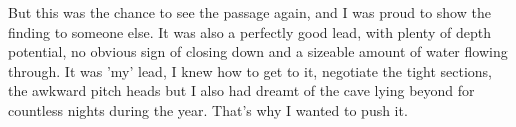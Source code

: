 But this was the chance to see the passage again, and I was proud to show the finding to someone else. It was also a perfectly good lead, with plenty of depth potential, no obvious sign of closing down and a sizeable amount of water flowing through. It was 'my' lead, I knew how to get to it, negotiate the tight sections, the awkward pitch heads but I also had dreamt of the cave lying beyond for countless nights during the year. That's why I wanted to push it.

